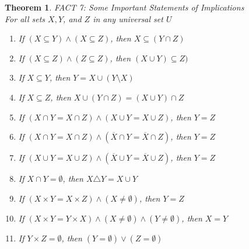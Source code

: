 \documentclass{book}
\newtheorem{theorem}{Theorem}[section]
\theoremstyle{definition}
\theoremstyle{remark}
\begin{document}
\begin{theorem}
FACT 7: Some Important Statements of Implications \\

For all sets $X, Y$, and $Z$ in any universal set $U$ \\

    \begin{enumerate}
        \item If $(X \subseteq Y) \wedge (X \subseteq Z)$, then $X \subseteq (Y \cap Z)$
        \item If $(X \subseteq Z) \wedge (Z \subseteq Z)$, then $(X \cup Y) \subseteq Z)$
        \item If $X \subseteq Y$, then $Y = X \cup (Y \setminus X)$
        \item If $X \subseteq Z$, then $X \cup (Y \cap Z) = (X \cup Y) \cap Z$
        \item If $(X \cap Y = X \cap Z) \wedge (X \cup Y = X \cup Z)$, then $Y = Z$
        \item If $(X \cap Y = X \cap Z) \wedge (\overline{X} \cap Y = \overline{X} \cap Z)$, then $Y = Z$
        \item If $(X \cup Y = X \cup Z) \wedge (\overline{X} \cup Y = \overline{X} \cup Z)$, then $Y = Z$
        \item If $X \cap Y = \emptyset$, then $X \triangle Y = X \cup Y$
        \item If $(X \times Y = X \times Z) \wedge (X \neq \emptyset)$, then $Y = Z$
        \item If $(X \times Y = Y \times X) \wedge (X \neq \emptyset) \wedge (Y \neq \emptyset)$, then $X = Y$
        \item If $Y \times Z = \emptyset$, then $(Y = \emptyset) \vee (Z = \emptyset)$
    \end{enumerate}
\end{theorem}
\end{document}
